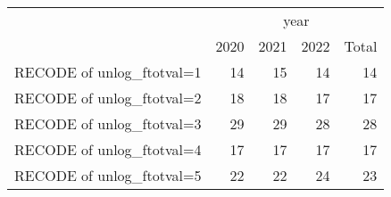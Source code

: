 \begin{tabular}{lllll}
\cline{1-5}
\multicolumn{1}{c}{} &
  \multicolumn{4}{|c}{year} \\
\multicolumn{1}{c}{} &
  \multicolumn{1}{|r}{2020} &
  \multicolumn{1}{r}{2021} &
  \multicolumn{1}{r}{2022} &
  \multicolumn{1}{r}{Total} \\
\cline{1-5}
\multicolumn{1}{l}{RECODE of unlog\_ftotval=1} &
  \multicolumn{1}{|r}{14} &
  \multicolumn{1}{r}{15} &
  \multicolumn{1}{r}{14} &
  \multicolumn{1}{r}{14} \\
\multicolumn{1}{l}{RECODE of unlog\_ftotval=2} &
  \multicolumn{1}{|r}{18} &
  \multicolumn{1}{r}{18} &
  \multicolumn{1}{r}{17} &
  \multicolumn{1}{r}{17} \\
\multicolumn{1}{l}{RECODE of unlog\_ftotval=3} &
  \multicolumn{1}{|r}{29} &
  \multicolumn{1}{r}{29} &
  \multicolumn{1}{r}{28} &
  \multicolumn{1}{r}{28} \\
\multicolumn{1}{l}{RECODE of unlog\_ftotval=4} &
  \multicolumn{1}{|r}{17} &
  \multicolumn{1}{r}{17} &
  \multicolumn{1}{r}{17} &
  \multicolumn{1}{r}{17} \\
\multicolumn{1}{l}{RECODE of unlog\_ftotval=5} &
  \multicolumn{1}{|r}{22} &
  \multicolumn{1}{r}{22} &
  \multicolumn{1}{r}{24} &
  \multicolumn{1}{r}{23} \\
\cline{1-5}
\end{tabular}
